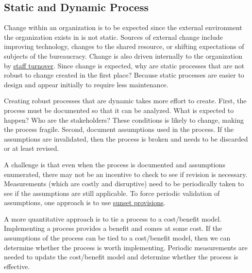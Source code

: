 \subsection*{Static and Dynamic Process\label{sec:static-dynamic-processes}}


Change within an \gls{organization} 
is to be expected since the external environment the organization exists in is not static. Sources of external change include improving technology,  changes to the \gls{shared resource},
or shifting expectations of subjects of the bureaucracy.
Change is also driven internally to the organization by \hyperref[sec:turnover]{staff turnover}.
Since change is expected, why are static processes that are not robust to change created in the first place? Because static processes are easier to design and appear initially to require less maintenance.

Creating robust processes that are dynamic takes more effort to create. First, the process must be documented so that it can be analyzed. What is expected to happen? Who are the stakeholders? These conditions is likely to change, making the process fragile. Second, document assumptions used in the process. If the assumptions are invalidated, then the process is broken and needs to be discarded or at least revised. 

A challenge is that even when the process is documented and assumptions enumerated, there may not be an incentive to check to see if revision is necessary. Measurements (which are costly and disruptive) need to be periodically taken to see if the assumptions are still applicable. To force periodic validation of assumptions, one approach is to use \href{https://en.wikipedia.org/wiki/Sunset_provision}{sunset provisions}. 

A more quantitative approach is to tie a process to a cost/benefit model. Implementing a process provides a benefit and comes at some cost. If the assumptions of the process can be tied to a cost/benefit model, then we can determine whether the process is worth implementing. Periodic measurements are needed to update the cost/benefit model and determine whether the process is effective.

